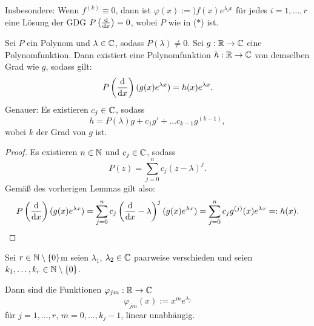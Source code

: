 Insbesondere: Wenn $f^{(k)} \equiv 0$, dann ist $\varphi(x) :=) f(x)
e^{\lambda_i x}$ für jedes $i = 1, \ldots, r$ eine Lösung der GDG $P\left(
  \frac{\mathrm{d} }{\mathrm{d} x} \right) = 0$, wobei $P$ wie in ($\ast$) ist.

\begin{lem}
  Sei $P$ ein Polynom und $\lambda \in \mathbb{C}$, sodass $P(\lambda) \ne 0$. Sei
  $g : \mathbb{R} \to \mathbb{C}$ eine Polynomfunktion. Dann existiert eine
  Polynomfunktion $h:\mathbb{R} \to \mathbb{C}$ von demselben Grad wie $g$, sodass
  gilt:
  \[ P \left( \frac{\mathrm{d} }{\mathrm{d} x}  \right) (g(x) e^{\lambda x}) = h(x) e^{\lambda x}. \]
  Genauer: Es existieren $c_j \in \mathbb{C}$, sodass
  \[ h = P(\lambda) g + c_1 g' + \ldots c_{k-1} g^{(k-1)}, \]
  wobei $k$ der Grad von $g$ ist.
\end{lem}

\begin{proof}
  Es existieren $n \in \mathbb{N}$ und $c_j \in \mathbb{C}$, sodass
  \[ P(z) = \sum_{j=0}^n c_j (z-\lambda)^j. \]
  Gemäß des vorherigen Lemmas gilt also:
  \[ P \left( \frac{\mathrm{d} }{\mathrm{d} x} \right) (g(x) e^{\lambda x}) =  \sum_{j=0}^n c_j \left(
    \frac{\mathrm{d} }{\mathrm{d} x} - \lambda \right)^j (g(x) e^{\lambda x}) = \sum_{j=0}^n c_j
  g^{(j)}(x) e^{\lambda x} =: h(x).
  \qedhere
  \]
\end{proof}

\begin{prp}
  Sei $r \in \mathbb{N} \setminus \{ 0 \}$m seien $\lambda_1$, $\lambda_2 \in
  \mathbb{C}$ paarweise verschieden und seien $k_1, \ldots, k_r \in \mathbb{N} \setminus
  \{0\}$.

  Dann sind die Funktionen $\varphi_{jm}:\mathbb{R} \to \mathbb{C}$
  \[ \varphi_{jm}(x) := x^m e^{\lambda_j} \]
  für $j = 1, \ldots, r$, $m = 0, \ldots, k_j - 1$, linear unabhängig.
\end{prp}

